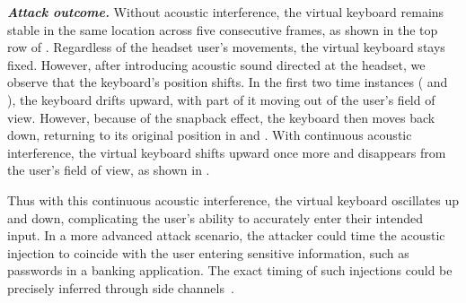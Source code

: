 \noindent \emph{\textbf{Attack outcome.}} Without acoustic interference, the virtual keyboard remains stable in the same location across five consecutive frames, as shown in the top row of . Regardless of the headset user’s movements, the virtual keyboard stays fixed.  However, after introducing acoustic sound directed at the headset, we observe that the keyboard’s position shifts. In the first two time instances ( and ), the keyboard drifts upward, with part of it moving out of the user’s field of view. However, because of the snapback effect, the keyboard then moves back down, returning to its original position in  and . With continuous acoustic interference, the virtual keyboard shifts upward once more and disappears from the user’s field of view, as shown in . 

Thus with this continuous acoustic interference, the virtual keyboard oscillates up and down, complicating the user’s ability to accurately enter their intended input. In a more advanced attack scenario, the attacker could time the acoustic injection to coincide with the user entering sensitive information, such as passwords in a banking application. The exact timing of such injections could be precisely inferred through side channels~\cite{slocum2023going,zhang2023its}.

